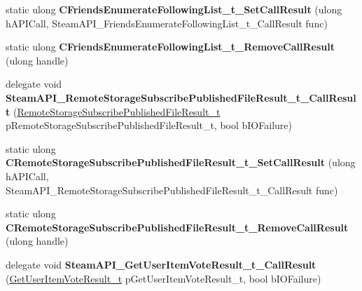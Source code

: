 \begin{DoxyCompactItemize}
static ulong {\bfseries C\+Friends\+Enumerate\+Following\+List\+\_\+t\+\_\+\+Set\+Call\+Result} (ulong h\+A\+P\+I\+Call, Steam\+A\+P\+I\+\_\+\+Friends\+Enumerate\+Following\+List\+\_\+t\+\_\+\+Call\+Result func)
\item 
\mbox{\label{class_valve_1_1_interop_1_1_native_entrypoints_a239a1c3b1893f60b129ff05fbc5bb0e1}} 
static ulong {\bfseries C\+Friends\+Enumerate\+Following\+List\+\_\+t\+\_\+\+Remove\+Call\+Result} (ulong handle)
\item 
\mbox{\label{class_valve_1_1_interop_1_1_native_entrypoints_aab64adca59941a455912d97590068059}} 
delegate void {\bfseries Steam\+A\+P\+I\+\_\+\+Remote\+Storage\+Subscribe\+Published\+File\+Result\+\_\+t\+\_\+\+Call\+Result} (\hyperlink{struct_valve_1_1_steamworks_1_1_remote_storage_subscribe_published_file_result__t}{Remote\+Storage\+Subscribe\+Published\+File\+Result\+\_\+t} p\+Remote\+Storage\+Subscribe\+Published\+File\+Result\+\_\+t, bool b\+I\+O\+Failure)
\item 
\mbox{\label{class_valve_1_1_interop_1_1_native_entrypoints_a2ddcb902179c1221d0712ce873899494}} 
static ulong {\bfseries C\+Remote\+Storage\+Subscribe\+Published\+File\+Result\+\_\+t\+\_\+\+Set\+Call\+Result} (ulong h\+A\+P\+I\+Call, Steam\+A\+P\+I\+\_\+\+Remote\+Storage\+Subscribe\+Published\+File\+Result\+\_\+t\+\_\+\+Call\+Result func)
\item 
\mbox{\label{class_valve_1_1_interop_1_1_native_entrypoints_a45d376a11a936696ad0ac30e4bc0fc83}} 
static ulong {\bfseries C\+Remote\+Storage\+Subscribe\+Published\+File\+Result\+\_\+t\+\_\+\+Remove\+Call\+Result} (ulong handle)
\item 
\mbox{\label{class_valve_1_1_interop_1_1_native_entrypoints_aad484d5786a868c35e9b4811606abbb1}} 
delegate void {\bfseries Steam\+A\+P\+I\+\_\+\+Get\+User\+Item\+Vote\+Result\+\_\+t\+\_\+\+Call\+Result} (\hyperlink{struct_valve_1_1_steamworks_1_1_get_user_item_vote_result__t}{Get\+User\+Item\+Vote\+Result\+\_\+t} p\+Get\+User\+Item\+Vote\+Result\+\_\+t, bool b\+I\+O\+Failure)
\item 
\mbox{\label{class_valve_1_1_interop_1_1_native_entrypoints_a0df2a44ad3dc857b8b7d770141c3c624}} 

\end{DoxyCompactItemize}
